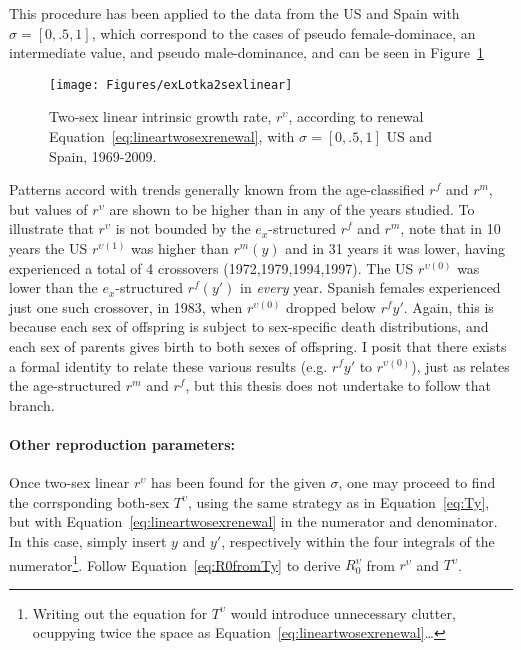 This procedure has been applied to the data from the US and Spain with $\sigma
= [0,.5,1]$, which correspond to the cases of pseudo female-dominace, an
intermediate value, and pseudo male-dominance, and can be seen in
Figure~\ref{fig:rupsilonlinear2sex}

\begin{figure}[!ht]
  \centering
    \caption{Two-sex linear intrinsic growth rate, $r^\upsilon$, according to
    renewal Equation~\eqref{eq:lineartwosexrenewal}, with $\sigma = [0, .5, 1]$ US 
    and Spain, 1969-2009.}
     \texttt{[image: Figures/exLotka2sexlinear]}
     \label{fig:rupsilonlinear2sex}
\end{figure}

Patterns accord with trends generally known from the age-classified $r^f$ and
$r^m$, but values of $r^\upsilon$ are shown to be higher than in any of the
years studied. To illustrate that $r^\upsilon$ is not bounded by the
$e_x$-structured $r^f$ and $r^m$, note that in 10 years the US $r^{\upsilon
(1)}$ was higher than $r^m(y)$ and in 31 years it was lower, having experienced 
a total of 4 crossovers (1972,1979,1994,1997). The US $r^{\upsilon (0)}$ was lower than
the $e_x$-structured $r^f(y')$ in \textit{every} year. Spanish females
experienced just one such crossover, in 1983, when $r^{\upsilon (0)}$ dropped
below $r^f{y'}$. Again, this is because each sex of offspring is subject to
sex-specific death distributions, and each sex of parents gives birth to both
sexes of offspring. I posit that there exists a formal identity to relate these
various results (e.g. $r^f{y'}$ to $r^{\upsilon (0)}$), just as
\citet[pp. 56]{coale1972growth} relates the age-structured $r^m$ and $r^f$,
but this thesis does not undertake to follow that branch.

\paragraph{Other reproduction parameters:}

Once two-sex linear $r^\upsilon$ has been found for the given $\sigma$, one may
proceed to find the corrsponding both-sex $T^\upsilon$, using the same strategy as in
Equation~\eqref{eq:Ty}, but with Equation~\eqref{eq:lineartwosexrenewal} in the
numerator and denominator. In this case, simply insert $y$ and $y'$,
respectively within the four integrals of the numerator\footnote{Writing out the
equation for $T^\upsilon$ would introduce unnecessary clutter, ocuppying twice the space as
Equation~\eqref{eq:lineartwosexrenewal}\ldots}. Follow
Equation~\eqref{eq:R0fromTy} to derive $R_0^\upsilon$ from $r^\upsilon$ and
$T^\upsilon$.

